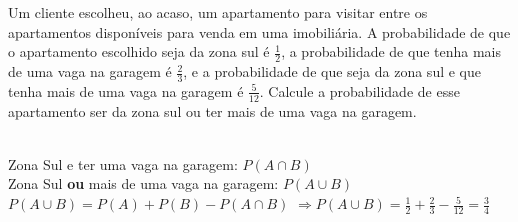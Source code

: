 \begin{ex}
Um cliente escolheu, ao acaso, um apartamento para visitar entre os apartamentos disponíveis para venda em uma imobiliária. A probabilidade de que o apartamento escolhido seja da zona sul é $\frac{1}{2}$, a probabilidade de que tenha mais de uma vaga na garagem é $\frac{2}{3}$, e a probabilidade de que seja da zona sul e que tenha mais de uma vaga na garagem é $\frac{5}{12}$. Calcule a probabilidade de esse apartamento ser da zona sul ou ter mais de uma vaga na garagem.
  \begin{sol}
     \phantom{A} \\
     Zona Sul e ter uma vaga na garagem: \hspace{0,3cm} $P(A \cap B)$\\
     Zona Sul \textbf{ou} mais de uma vaga na garagem: \hspace{0,3cm} $ P(A \cup B)$  \\
    $ P(A \cup B)= P(A)+P(B)-P(A \cap B) $ 
    $ \Longrightarrow P(A \cup B)= \frac{1}{2}+\frac{2}{3}-\frac{5}{12}=\frac{3}{4}$
  \end{sol}
\end{ex}